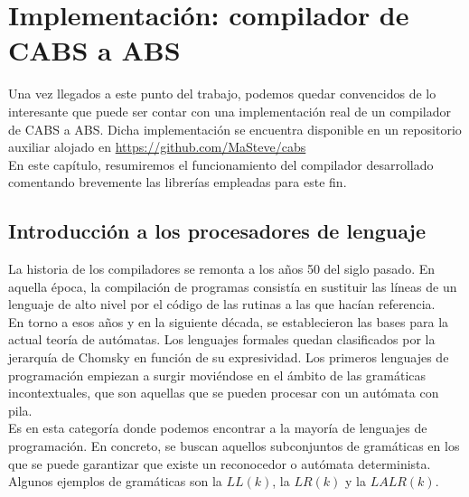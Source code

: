 \chapter{Implementación: compilador de CABS a ABS}

Una vez llegados a este punto del trabajo, podemos quedar convencidos de lo interesante que puede ser contar con una implementación real de un compilador de CABS a ABS. Dicha implementación se encuentra disponible en un repositorio auxiliar alojado en \url{https://github.com/MaSteve/cabs}\\

En este capítulo, resumiremos el funcionamiento del compilador desarrollado comentando brevemente las librerías empleadas para este fin.

\section{Introducción a los procesadores de lenguaje}

La historia de los compiladores se remonta a los años 50 del siglo pasado. En aquella época, la compilación de programas consistía en sustituir las líneas de un lenguaje de alto nivel por el código de las rutinas a las que hacían referencia.\\

En torno a esos años y en la siguiente década, se establecieron las bases para la actual teoría de autómatas. Los lenguajes formales quedan clasificados por la jerarquía de Chomsky en función de su expresividad. Los primeros lenguajes de programación empiezan a surgir moviéndose en el ámbito de las gramáticas incontextuales, que son aquellas que se pueden procesar con un autómata con pila.\\

Es en esta categoría donde podemos encontrar a la mayoría de lenguajes de programación. En concreto, se buscan aquellos subconjuntos de gramáticas en los que se puede garantizar que existe un reconocedor o autómata determinista. Algunos ejemplos de gramáticas son la $LL(k)$, la $LR(k)$ y la $LALR(k)$.\\

